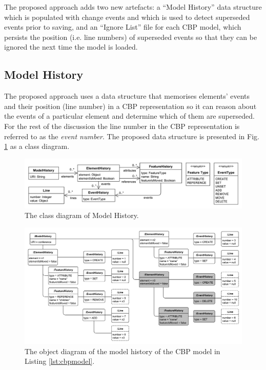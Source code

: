 \documentclass[12pt, a4paper]{report} \usepackage[titletoc]{appendix}
\begin{document}
The proposed approach adds two new artefacts: a ``Model History'' data structure which is populated with change events and which is used to detect superseded events prior to saving, and an ``Ignore List'' file for each CBP model, which persists the position (i.e. line numbers) of superseded events so that they can be ignored the next time the model is loaded.

\subsection{Model History}
\label{subsec:model_history}
The proposed approach uses a data structure that memorises elements' events and their position (line number) in a CBP representation so it can reason about the events of a particular element and determine which of them are superseded. For the rest of the discussion the line number in the CBP representation is referred to as the \emph{event number}. The proposed data structure is presented in Fig. \ref{fig:object_history} as a class diagram.  

\begin{figure}[ht]
	\centering
	\includegraphics[width=\linewidth]{object_history}
	\caption{The class diagram of Model History.}
	\label{fig:object_history}
\end{figure}

\begin{figure}[ht]
	\centering
	\includegraphics[width=\linewidth]{history_structure}
	\caption{The object diagram of the model history of the CBP model in Listing \ref{lst:cbpmodel}.}
	\label{fig:history_structure}
\end{figure}
\end{document}
